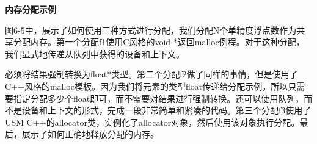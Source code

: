 \hspace*{\fill} \par %
\textbf{内存分配示例}

图6-5中，展示了如何使用三种方式进行分配，我们分配N个单精度浮点数作为共享分配内存。第一个分配f1使用C风格的void *返回malloc例程。对于这种分配，我们显式地传递从队列中获得的设备和上下文。\par

必须将结果强制转换为float*类型。第二个分配f2做了同样的事情，但是使用了C++风格的malloc模板。因为我们将元素的类型float传递给分配示例，所以只需要指定分配多少个float即可，而不需要对结果进行强制转换。还可以使用队列，而不是设备和上下文的形式，完成一段非常简单和紧凑的代码。第三个分配f3使用了USM C++的allocator类，实例化了allocator对象，然后使用该对象执行分配。最后，展示了如何正确地释放分配的内存。\par












































